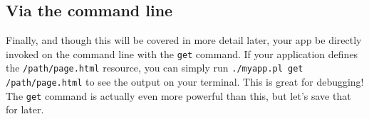 \subsection{Via the command line}

Finally, and though this will be covered in more detail later, your app be directly invoked on the command line with the \verb!get! command.
If your application defines the \verb!/path/page.html! resource, you can simply run \verb!./myapp.pl get /path/page.html! to see the output on your terminal.
This is great for debugging!
The \verb!get! command is actually even more powerful than this, but let's save that for later.



